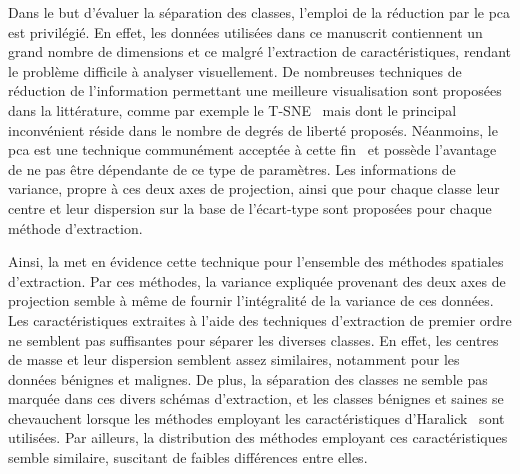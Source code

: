 Dans le but d'évaluer la séparation des classes, l'emploi de la réduction par le \gls{pca} est privilégié. En effet, les données utilisées dans ce manuscrit contiennent un grand nombre de dimensions et ce malgré l'extraction de caractéristiques, rendant le problème difficile à analyser visuellement. De nombreuses techniques de réduction de l'information permettant une meilleure visualisation sont proposées dans la littérature, comme par exemple le T-SNE~\cite{Maaten2008} mais dont le principal inconvénient réside dans le nombre de degrés de liberté proposés. Néanmoins, le \gls{pca} est une technique communément acceptée à cette fin~\cite{Himberg2001} et possède l'avantage de ne pas être dépendante de ce type de paramètres. Les informations de variance, propre à ces deux axes de projection, ainsi que pour chaque classe leur centre et leur dispersion sur la base de l'écart-type sont proposées pour chaque méthode d'extraction.\par

Ainsi, la  met en évidence cette technique pour l'ensemble des méthodes spatiales d'extraction. Par ces méthodes, la variance expliquée provenant des deux axes de projection semble à même de fournir l'intégralité de la variance de ces données. Les caractéristiques extraites à l'aide des techniques d'extraction de premier ordre ne semblent pas suffisantes pour séparer les diverses classes. En effet, les centres de masse et leur dispersion semblent assez similaires, notamment pour les données bénignes et malignes. De plus, la séparation des classes ne semble pas marquée dans ces divers schémas d'extraction, et les classes bénignes et saines se chevauchent lorsque les méthodes employant les caractéristiques d'Haralick~ sont utilisées. Par ailleurs, la distribution des méthodes employant ces caractéristiques semble similaire, suscitant de faibles différences entre elles.\par

